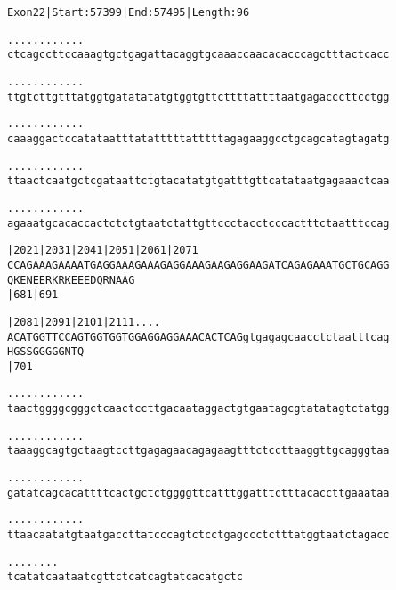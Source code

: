 \documentclass{article}
\begin{document}
\newpage
\begin{alltt}
Exon 22 | Start: 57399 | End: 57495 | Length: 96

.    .    .    .    .    .    .    .    .    .    .    .
ctcagccttccaaagtgctgagattacaggtgcaaaccaacacacccagctttactcacc



.    .    .    .    .    .    .    .    .    .    .    .
ttgtcttgtttatggtgatatatatgtggtgttcttttattttaatgagacccttcctgg



.    .    .    .    .    .    .    .    .    .    .    .
caaaggactccatataatttatatttttatttttagagaaggcctgcagcatagtagatg



.    .    .    .    .    .    .    .    .    .    .    .
ttaactcaatgctcgataattctgtacatatgtgatttgttcatataatgagaaactcaa



.    .    .    .    .    .    .    .    .    .    .    .
agaaatgcacaccactctctgtaatctattgttccctacctcccactttctaatttccag



     |2021     |2031     |2041     |2051     |2061     |2071
CCAGAAAGAAAATGAGGAAAGAAAGAGGAAAGAAGAGGAAGATCAGAGAAATGCTGCAGG
 Q  K  E  N  E  E  R  K  R  K  E  E  E  D  Q  R  N  A  A  G
                         |681                          |691

     |2081     |2091     |2101     |2111 .    .    .    .
ACATGGTTCCAGTGGTGGTGGAGGAGGAAACACTCAGgtgagagcaacctctaatttcag
 H  G  S  S  G  G  G  G  G  N  T  Q
                         |701

 .    .    .    .    .    .    .    .    .    .    .    .
taactggggcgggctcaactccttgacaataggactgtgaatagcgtatatagtctatgg



\end{alltt}
\newpage
\begin{alltt}
 .    .    .    .    .    .    .    .    .    .    .    .
taaaggcagtgctaagtccttgagagaacagagaagtttctccttaaggttgcagggtaa



 .    .    .    .    .    .    .    .    .    .    .    .
gatatcagcacattttcactgctctggggttcatttggatttctttacaccttgaaataa



 .    .    .    .    .    .    .    .    .    .    .    .
ttaacaatatgtaatgaccttatcccagtctcctgagccctctttatggtaatctagacc



 .    .    .    .    .    .    .    .
tcatatcaataatcgttctcatcagtatcacatgctc


\end{alltt}
\end{document}
